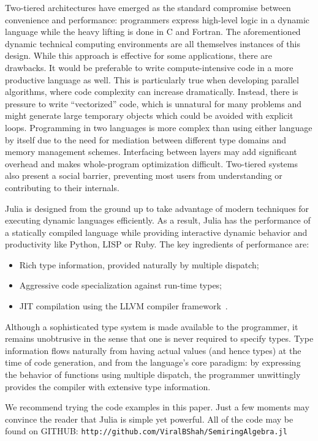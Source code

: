 \documentclass[conference]{IEEEtran}
\begin{document}
Two-tiered architectures have emerged as the standard compromise between
convenience and performance: programmers express high-level logic in a
dynamic language while the heavy lifting is done in C and Fortran. The
aforementioned dynamic technical computing environments are all themselves
instances of this design. While this approach is effective for some
applications, there are drawbacks. It would be preferable to write
compute-intensive code in a more productive language as well. This is
particularly true when developing parallel algorithms, where code
complexity can increase dramatically. Instead, there is pressure to write
``vectorized'' code, which is unnatural for many problems and might
generate large temporary objects which could be avoided with explicit
loops. Programming in two languages is more complex than using either
language by itself due to the need for mediation between different type
domains and memory management schemes. Interfacing between layers may add
significant overhead and makes whole-program optimization difficult.
Two-tiered systems also present a social barrier, preventing most users
from understanding or contributing to their internals.

Julia is designed from the ground up to take advantage of modern
techniques for executing dynamic languages efficiently. As a result, Julia
has the performance of a statically compiled language while providing
interactive dynamic behavior and productivity like Python, LISP or Ruby.
The key ingredients of performance are:
\begin{itemize}
\item Rich type information, provided naturally by multiple dispatch;
\item Aggressive code specialization against run-time types;
\item JIT compilation using the LLVM compiler framework~\cite{LLVM}.
\end{itemize}
Although a sophisticated type system is made available to the programmer,
it remains unobtrusive in the sense that one is never required to specify
types. Type information flows naturally from having actual values (and
hence types) at the time of code generation, and from the language's core
paradigm: by expressing the behavior of functions using multiple dispatch,
the programmer unwittingly provides the compiler with extensive type
information.

We recommend trying the code examples in this paper.  Just a few moments may
convince the reader that Julia is simple yet powerful.
All of the code may be found on GITHUB: \verb+http://github.com/ViralBShah/SemiringAlgebra.jl+
\end{document}
